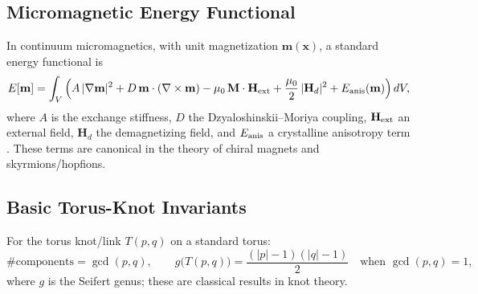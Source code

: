 \documentclass[11pt, a4paper]{article}
\begin{document}
\subsection{Micromagnetic Energy Functional}
In continuum micromagnetics, with unit magnetization \(\mathbf m(\mathbf x)\), a standard energy functional is
\begin{equation}
    E[\mathbf m] = \int_V \Big(
    A\,\lvert\nabla \mathbf m\rvert^2
    + D\, \mathbf m\cdot(\nabla\times \mathbf m)
    - \mu_0\,\mathbf M\cdot \mathbf H_{\rm ext}
    + \frac{\mu_0}{2}\,\lvert \mathbf H_d\rvert^2
    + E_{\rm anis}(\mathbf m)
    \Big)\, dV,
    \label{eq:micromagnetics}
\end{equation}
where \(A\) is the exchange stiffness, \(D\) the Dzyaloshinskii--Moriya coupling, \(\mathbf H_{\rm ext}\) an external field, \(\mathbf H_d\) the demagnetizing field, and \(E_{\rm anis}\) a crystalline anisotropy term \cite{Dzyaloshinskii1958,Moriya1960,Aharoni1996}. These terms are canonical in the theory of chiral magnets and skyrmions/hopfions.

\subsection{Basic Torus-Knot Invariants}
For the torus knot/link \(T(p,q)\) on a standard torus:
\begin{equation}
    \#\text{components} = \gcd(p,q), \qquad
    g\big(T(p,q)\big) = \frac{(|p|-1)(|q|-1)}{2}\quad\text{when }\gcd(p,q)=1,
    \label{eq:torusInvariants}
\end{equation}
where \(g\) is the Seifert genus; these are classical results in knot theory.


\nocite{*}



    
\end{document}

